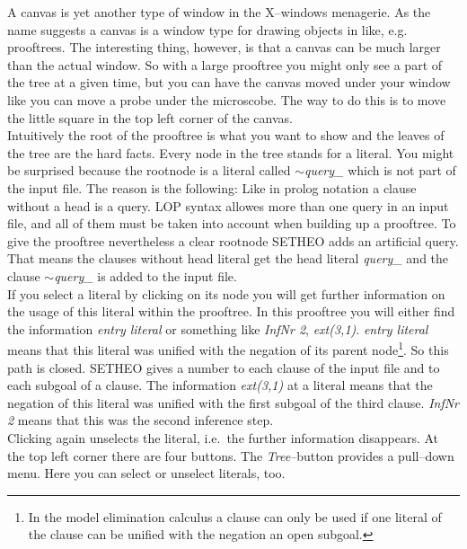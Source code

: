 
A canvas is yet another type of window in the X--windows menagerie. As
the name suggests a canvas is a window type for drawing objects in
like, e.g. prooftrees. The interesting thing, however, is that a
canvas can be much larger than the actual window. So with a large
prooftree you might only see a part of the tree at a given time, but
you can have the canvas moved under your window like you can move a
probe under the microscobe. The way to do this is to move the little
square in the top left corner of the canvas.\\
Intuitively the root of the prooftree is what you want to show and the
leaves of the tree are the hard facts. Every node in the tree stands
for a literal. You might be surprised because the rootnode is a
literal called {\it $\sim$query\_\/} which is not part of 
the input file. The reason is the following: Like in prolog notation a
clause without a head is a query. LOP syntax allowes more than one
query in an input file, and all of them must be taken into account
when building up a prooftree. To give the prooftree nevertheless a
clear rootnode SETHEO adds an artificial query. That means the clauses
without head literal get the head literal {\it query\_\/} and the clause
{\it $\sim$query\_\/} is added to the input file.\\
If you select a literal by clicking on its node you will
get further information on the usage of this literal within the
prooftree. In this prooftree you will either find the information {\it
entry literal\/} or something like {\it InfNr 2}, {\it ext(3,1)}. {\it
entry literal\/} means that this literal was unified with the negation
of its parent node\footnote{In the model elimination calculus a clause
can only be used if one literal of the clause can be unified with the
negation an open subgoal.}. So this path is closed. SETHEO gives a
number to each clause of the input file and to each subgoal of a
clause. The information {\it ext(3,1)} at a literal means that the
negation of this literal was unified with the first subgoal of the
third clause. {\it InfNr 2} means that this was the second inference
step.\\
Clicking again unselects the literal, i.e.\ the further
information disappears. At the top left corner there are four
buttons. The {\it Tree\/}--button provides a pull--down menu. Here you
can select or unselect literals, too.

